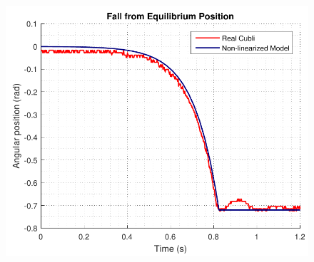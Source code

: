 \begin{minipage}{\linewidth}
	\begin{minipage}{0.5\linewidth}
		\begin{figure}[H]
			\includegraphics[scale=.48]{figures/FallTestComparison}
			\centering
			\captionsetup{justification=centering}
			\label{FallTestComparison}
		\end{figure}\vspace{-5mm}
	\end{minipage}
	\hspace{0.03\linewidth}
	\begin{minipage}{0.5\linewidth}
		\begin{figure}[H]

\end{figure}
\end{minipage}
\end{minipage}
